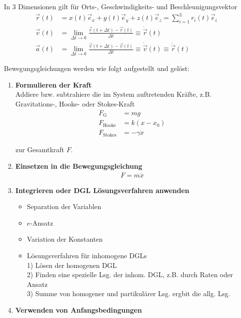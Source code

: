 \documentclass{article}
\begin{document}
In 3 Dimensionen gilt für Orts-, Geschwindigkeits- und Beschleunigungsvektor
	\begin{align}
		\vec{r}(t) &= x(t) \vec{e}_x + y(t) \vec{e}_y + z(t) \vec{e}_z = \sum_{i=1}^3 r_i(t) \vec{e}_i \\
		\vec{v}(t) &= \lim_{\Delta t\to 0} \frac{\vec{r}(t + \Delta t) - \vec{r}(t)}{\Delta t} \equiv \dot{\vec{r}}(t) \\
		\vec{a}(t) &= \lim_{\Delta t\to 0} \frac{\vec{v}(t + \Delta t) - \vec{v}(t)}{\Delta t} \equiv \dot{\vec{v}}(t) \equiv \ddot{\vec{r}}(t)
	\end{align}


\newpage


Bewegungsgleichungen werden wie folgt aufgestellt und gelöst:
\begin{enumerate}
	\item \textbf{Formulieren der Kraft}\\
	Addiere bzw. subtrahiere die im System auftretenden Kräfte, z.B. Gravitations-, Hooke- oder Stokes-Kraft
		\begin{align}
			F_{\text{G}} &= mg \\
			F_{\text{Hooke}} &= k (x-x_0) \\
			F_{\text{Stokes}} &= -\gamma \dot{x}
		\end{align}
	
	zur Gesamtkraft $F$.

	
	\item \textbf{Einsetzen in die Bewegungsgleichung}
		\begin{align*}
			F = m\ddot{x}
		\end{align*}


	\item \textbf{Integrieren oder DGL Lösungsverfahren anwenden}
		\begin{itemize}
			\item Separation der Variablen
			\item $e$-Ansatz
			\item Variation der Konstanten
			\item Lösungsverfahren für inhomogene DGLs\\
			1) Lösen der homogenen DGL \\
			2) Finden eine spezielle Lsg. der inhom. DGL, z.B. durch Raten oder Ansatz\\
			3) Summe von homogener und partikulärer Lsg. ergbit die allg. Lsg.	
		\end{itemize}


	\item \textbf{Verwenden von Anfangsbedingungen}
\end{enumerate}
\end{document}
